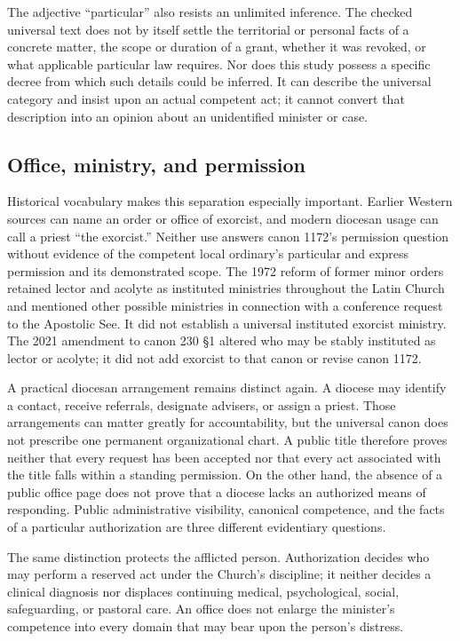 The adjective ``particular'' also resists an unlimited inference. The checked
universal text does not by itself settle the territorial or personal facts of
a concrete matter, the scope or duration of a grant, whether it was revoked,
or what applicable particular law requires. Nor does this study possess a
specific decree from which such details could be inferred. It can describe the
universal category and insist upon an actual competent act; it cannot convert
that description into an opinion about an unidentified minister or case.

\subsection{Office, ministry, and permission}

Historical vocabulary makes this separation especially important. Earlier
Western sources can name an order or office of exorcist, and modern diocesan
usage can call a priest ``the exorcist.'' Neither use answers canon 1172's
permission question without evidence of the competent local ordinary's
particular and express permission and its demonstrated scope. The 1972 reform of former
minor orders retained lector and acolyte as instituted ministries throughout
the Latin Church and mentioned other possible ministries in connection with a
conference request to the Apostolic See. It did not establish a universal
instituted exorcist ministry. The 2021 amendment to canon 230 \S1 altered who
may be stably instituted as lector or acolyte; it did not add exorcist to that
canon or revise canon 1172.

A practical diocesan arrangement remains distinct again. A diocese may
identify a contact, receive referrals, designate advisers, or assign a priest.
Those arrangements can matter greatly for accountability, but the universal
canon does not prescribe one permanent organizational chart. A public title
therefore proves neither that every request has been accepted nor that every
act associated with the title falls within a standing permission. On the other
hand, the absence of a public office page does not prove that a diocese lacks
an authorized means of responding. Public administrative visibility,
canonical competence, and the facts of a particular authorization are three
different evidentiary questions.

The same distinction protects the afflicted person. Authorization decides who
may perform a reserved act under the Church's discipline; it neither decides a
clinical diagnosis nor displaces continuing medical, psychological, social,
safeguarding, or pastoral care. An office does not enlarge the minister's
competence into every domain that may bear upon the person's distress.


